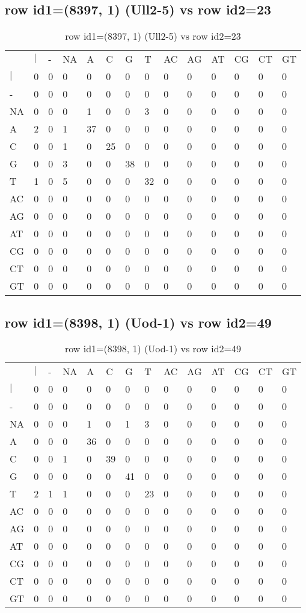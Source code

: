 \subsection{row id1=(8397, 1) (Ull2-5) vs row id2=23}
\begin{center}
\begin{longtable}{|l|l|l|l|l|l|l|l|l|l|l|l|l|l|}
\caption{row id1=(8397, 1) (Ull2-5) vs row id2=23} \label{table_dm650}\\
\hline
\\
\hline
&$|$&-&NA&A&C&G&T&AC&AG&AT&CG&CT&GT\\
$|$&0&0&0&0&0&0&0&0&0&0&0&0&0\\
-&0&0&0&0&0&0&0&0&0&0&0&0&0\\
NA&0&0&0&1&0&0&3&0&0&0&0&0&0\\
A&2&0&1&37&0&0&0&0&0&0&0&0&0\\
C&0&0&1&0&25&0&0&0&0&0&0&0&0\\
G&0&0&3&0&0&38&0&0&0&0&0&0&0\\
T&1&0&5&0&0&0&32&0&0&0&0&0&0\\
AC&0&0&0&0&0&0&0&0&0&0&0&0&0\\
AG&0&0&0&0&0&0&0&0&0&0&0&0&0\\
AT&0&0&0&0&0&0&0&0&0&0&0&0&0\\
CG&0&0&0&0&0&0&0&0&0&0&0&0&0\\
CT&0&0&0&0&0&0&0&0&0&0&0&0&0\\
GT&0&0&0&0&0&0&0&0&0&0&0&0&0\\
\hline
\end{longtable}
\end{center}

\subsection{row id1=(8398, 1) (Uod-1) vs row id2=49}
\begin{center}
\begin{longtable}{|l|l|l|l|l|l|l|l|l|l|l|l|l|l|}
\caption{row id1=(8398, 1) (Uod-1) vs row id2=49} \label{table_dm652}\\
\hline
\\
\hline
&$|$&-&NA&A&C&G&T&AC&AG&AT&CG&CT&GT\\
$|$&0&0&0&0&0&0&0&0&0&0&0&0&0\\
-&0&0&0&0&0&0&0&0&0&0&0&0&0\\
NA&0&0&0&1&0&1&3&0&0&0&0&0&0\\
A&0&0&0&36&0&0&0&0&0&0&0&0&0\\
C&0&0&1&0&39&0&0&0&0&0&0&0&0\\
G&0&0&0&0&0&41&0&0&0&0&0&0&0\\
T&2&1&1&0&0&0&23&0&0&0&0&0&0\\
AC&0&0&0&0&0&0&0&0&0&0&0&0&0\\
AG&0&0&0&0&0&0&0&0&0&0&0&0&0\\
AT&0&0&0&0&0&0&0&0&0&0&0&0&0\\
CG&0&0&0&0&0&0&0&0&0&0&0&0&0\\
CT&0&0&0&0&0&0&0&0&0&0&0&0&0\\
GT&0&0&0&0&0&0&0&0&0&0&0&0&0\\
\hline
\end{longtable}
\end{center}

